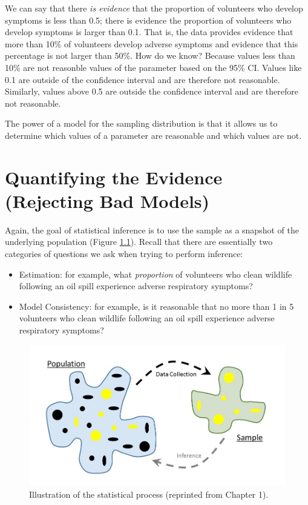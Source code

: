 \documentclass[]{book}
\providecommand{\tightlist}{%
  \setlength{\itemsep}{0pt}\setlength{\parskip}{0pt}}
\theoremstyle{plain}
\theoremstyle{mydefn}
\theoremstyle{myexmpl}
\theoremstyle{remark}
\begin{document}
We can say that there \emph{is evidence} that the proportion of
volunteers who develop symptoms is less than 0.5; there is evidence the
proportion of volunteers who develop symptoms is larger than 0.1. That
is, the data provides evidence that more than 10\% of volunteers develop
adverse symptoms and evidence that this percentage is not larger than
50\%. How do we know? Because values less than 10\% are not reasonble
values of the parameter based on the 95\% CI. Values like 0.1 are
outside of the confidence interval and are therefore not reasonable.
Similarly, values above 0.5 are outside the confidence interval and are
therefore not reasonable.

The power of a model for the sampling distribution is that it allows us
to determine which values of a parameter are reasonable and which values
are not.

\chapter{Quantifying the Evidence (Rejecting Bad
Models)}\label{NullDistns}

Again, the goal of statistical inference is to use the sample as a
snapshot of the underlying population (Figure
\ref{fig:nulldistns-statistical-process}). Recall that there are
essentially two categories of questions we ask when trying to perform
inference:

\begin{itemize}
\tightlist
\item
  Estimation: for example, what \emph{proportion} of volunteers who
  clean wildlife following an oil spill experience adverse respiratory
  symptoms?
\item
  Model Consistency: for example, is it reasonable that no more than 1
  in 5 volunteers who clean wildlife following an oil spill experience
  adverse respiratory symptoms?
\end{itemize}

\begin{figure}

{\centering \includegraphics[width=0.8\linewidth]{images/Basics-Stat-Process} 

}

\caption{Illustration of the statistical process (reprinted from Chapter 1).}\label{fig:nulldistns-statistical-process}
\end{figure}
\end{document}
